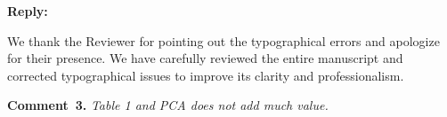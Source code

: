 \documentclass[a4paper,fleqn]{cas-sc}
\begin{document}
\noindent
\textcolor[rgb]{0.51,0.00,0.00}{\textbf{Reply:}}

We thank the Reviewer for pointing out the typographical errors and apologize for their presence.
We have carefully reviewed the entire manuscript and corrected typographical issues to improve its clarity and  professionalism.


%
%
%
%
%
%
%
%
%
%
%
%
\vspace{1cm}
\noindent
\textcolor[rgb]{0.00,0.50,1.00}{\textbf{Comment~3.}}
\emph{Table 1 and PCA does not add much value.}
\end{document}
